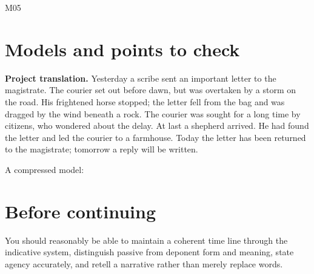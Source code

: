 \begin{courseunit}{M05}
\ifsolutions
\section{Models and points to check}

\textbf{Project translation.} Yesterday a scribe sent an important letter to
the magistrate. The courier set out before dawn, but was overtaken by a storm
on the road. His frightened horse stopped; the letter fell from the bag and
was dragged by the wind beneath a rock. The courier was sought for a long time
by citizens, who wondered about the delay. At last a shepherd arrived. He had
found the letter and led the courier to a farmhouse. Today the letter has been
returned to the magistrate; tomorrow a reply will be written.

A compressed model: 
\else
\section{Before continuing}

You should reasonably be able to maintain a coherent time line through the
indicative system, distinguish passive from deponent form and meaning, state
agency accurately, and retell a narrative rather than merely replace words.
\fi
\end{courseunit}

